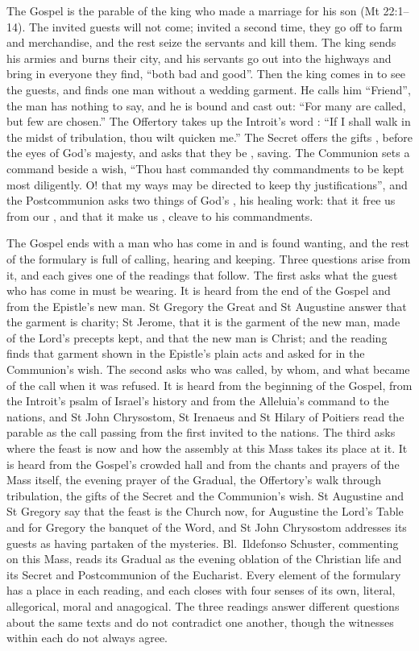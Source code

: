 The Gospel is the parable of the king who made a marriage for his son (Mt
22:1--14). The invited guests will not come; invited a second time, they go
off to farm and merchandise, and the rest seize the servants and kill them. The
king sends his armies and burns their city, and his servants go out into the
highways and bring in everyone they find, ``both bad and good''. Then the king
comes in to see the guests, and finds one man without a wedding garment. He
calls him ``Friend'', the man has nothing to say, and he is bound and cast out:
``For many are called, but few are chosen.'' The Offertory takes up the
Introit's word : ``If I shall walk in the midst of
tribulation, thou wilt quicken me.'' The Secret offers the gifts , before the eyes of God's majesty, and asks that they be
, saving. The Communion sets a command beside a wish, ``Thou
hast commanded thy commandments to be kept most diligently. O! that my ways may
be directed to keep thy justifications'', and the Postcommunion asks two things
of God's , his healing work: that it free us from
our , and that it make us , cleave
to his commandments.

The Gospel ends with a man who has come in and is found wanting, and the rest
of the formulary is full of calling, hearing and keeping. Three questions arise
from it, and each gives one of the readings that follow. The first asks what
the guest who has come in must be wearing. It is heard from the end of the
Gospel and from the Epistle's new man. St Gregory the Great and St Augustine
answer that the garment is charity; St Jerome, that it is the garment of the
new man, made of the Lord's precepts kept, and that the new man is Christ; and
the reading finds that garment shown in the Epistle's plain acts and asked for
in the Communion's wish. The second asks who was called, by whom, and what
became of the call when it was refused. It is heard from the beginning of the
Gospel, from the Introit's psalm of Israel's history and from the Alleluia's
command to the nations, and St John Chrysostom, St Irenaeus and St Hilary of
Poitiers read the parable as the call passing from the first invited to the
nations.
The third asks where the feast is now and how the assembly at this Mass takes
its place at it. It is heard from the Gospel's crowded hall and from the chants
and prayers of the Mass itself, the evening prayer of the Gradual, the
Offertory's walk through tribulation, the gifts of the Secret and the
Communion's wish. St Augustine and St Gregory say that the feast is the Church
now, for Augustine the Lord's Table and for Gregory the banquet of the Word,
and St John Chrysostom addresses its guests as having partaken of the
mysteries. Bl.\ Ildefonso Schuster,
commenting on this Mass, reads its Gradual as the evening oblation of the
Christian life and its Secret and Postcommunion of the Eucharist. Every element of the formulary has a place in each reading,
and each closes with four senses of its own, literal, allegorical, moral and
anagogical. The three readings answer different questions about the same texts
and do not contradict one another, though the witnesses within each do not
always agree.

